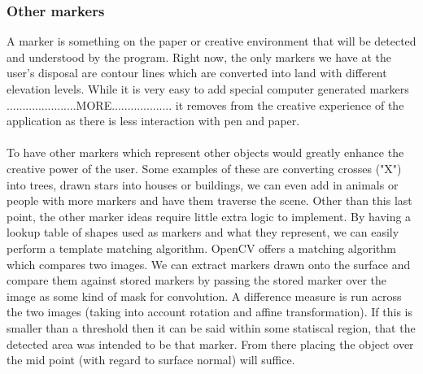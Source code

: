 \documentclass[11pt]{article}
\begin{document}
\subsubsection{Other markers}
A marker is something on the paper or creative environment that will be 
detected and understood by the program. Right now, the only markers we have
at the user's disposal are contour lines which are converted into land with
different elevation levels. While it is very easy to add special computer
generated markers ......................MORE...................
 						it removes from the creative experience of the application
as there is less interaction with pen and paper. \\
\\
To have other markers which represent other objects would greatly enhance the
creative power of the user. Some examples of these are converting crosses ("X")
into trees, drawn stars into houses or buildings, we can even add in animals 
or people with more markers and have them traverse the scene. Other than this
last point, the other marker ideas require little extra logic to implement.
By having a lookup table of shapes used as markers and what they represent, we
can easily perform a template matching algorithm. OpenCV offers a matching
algorithm which compares two images. We can extract markers drawn onto the
surface and compare them against stored markers by passing the stored marker
over the image as some kind of mask for convolution. A difference measure is run
across the two images (taking into account rotation and affine transformation).
If this is smaller than a threshold then it can be said within some statiscal
region, that the detected area was intended to be that marker. From there placing
the object over the mid point (with regard to surface normal) will suffice.
\end{document}

